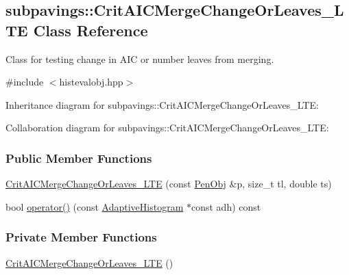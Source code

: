 \hypertarget{classsubpavings_1_1CritAICMergeChangeOrLeaves__LTE}{\subsection{subpavings\-:\-:\-Crit\-A\-I\-C\-Merge\-Change\-Or\-Leaves\-\_\-\-L\-T\-E \-Class \-Reference}
\label{classsubpavings_1_1CritAICMergeChangeOrLeaves__LTE}
}


\-Class for testing change in \-A\-I\-C or number leaves from merging.  




{\ttfamily \#include $<$histevalobj.\-hpp$>$}



\-Inheritance diagram for subpavings\-:\-:\-Crit\-A\-I\-C\-Merge\-Change\-Or\-Leaves\-\_\-\-L\-T\-E\-:


\-Collaboration diagram for subpavings\-:\-:\-Crit\-A\-I\-C\-Merge\-Change\-Or\-Leaves\-\_\-\-L\-T\-E\-:
\subsubsection*{\-Public \-Member \-Functions}
\begin{DoxyCompactItemize}
\item 
\hyperlink{classsubpavings_1_1CritAICMergeChangeOrLeaves__LTE_ae401398a1c7be59a530318aa9b93869b}{\-Crit\-A\-I\-C\-Merge\-Change\-Or\-Leaves\-\_\-\-L\-T\-E} (const \hyperlink{classsubpavings_1_1PenObj}{\-Pen\-Obj} \&p, size\-\_\-t tl, double ts)
\item 
bool \hyperlink{classsubpavings_1_1CritAICMergeChangeOrLeaves__LTE_a5f6d984852a0ee94e92f2a9f28e74953}{operator()} (const \hyperlink{classsubpavings_1_1AdaptiveHistogram}{\-Adaptive\-Histogram} $\ast$const adh) const 
\end{DoxyCompactItemize}
\subsubsection*{\-Private \-Member \-Functions}
\begin{DoxyCompactItemize}
\item 
\hyperlink{classsubpavings_1_1CritAICMergeChangeOrLeaves__LTE_a22f6e81490b265a369edabf533036c65}{\-Crit\-A\-I\-C\-Merge\-Change\-Or\-Leaves\-\_\-\-L\-T\-E} ()
\end{DoxyCompactItemize}
